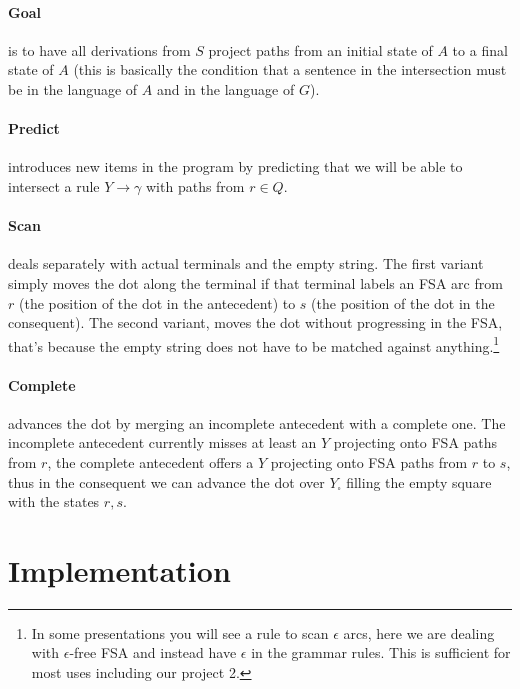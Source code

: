 \documentclass[11pt]{article}
\begin{document}
\paragraph{Goal} is to have all derivations from $S$ project paths from an initial state of $A$ to a final state of $A$ (this is basically the condition that a sentence in the intersection must be in the language of $A$ and in the language of $G$).

\paragraph{Predict} introduces new items in the program by predicting that we will be able to intersect a rule $Y \rightarrow \gamma$ with paths from $r \in Q$.

\paragraph{Scan} deals separately with actual terminals and the empty string. The first variant simply moves the dot along the terminal if that terminal labels an FSA arc from $r$ (the position of the dot in the antecedent) to $s$ (the position of the dot in the consequent). The second variant, moves the dot without progressing in the FSA, that's because the empty string does not have to be matched against anything.\footnote{In some presentations you will see a rule to scan $\epsilon$ arcs, here we are dealing with $\epsilon$-free FSA and instead have $\epsilon$ in the grammar rules. This is sufficient for most uses including our project 2.}

\paragraph{Complete} advances the dot by merging an incomplete antecedent with a complete one. The incomplete antecedent currently misses at least an $Y$ projecting onto FSA paths from $r$, the complete antecedent offers a $Y$ projecting onto FSA paths from $r$ to $s$, thus in the consequent we can advance the dot over $Y_\square$ filling the empty square with the states $r,s$.



\section{Implementation} 
\end{document}

